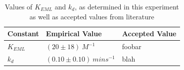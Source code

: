 \begin{table}[h]
    \begin{tabular}{| l | l | l |}
    \hline
    Constant & Empirical Value & Accepted Value \\ \hline
    $K_{EML}$ & $(20\pm{18}){\ }M^{-1}$ & foobar \\ \hline
    $k_{d}$ & $(0.10\pm{0.10}){\ }mins^{-1}$ & blah \\ 
    \hline
    \end{tabular}
    \caption[Table caption text]{Values of $K_{EML}$ and $k_d$, as determined in this experiment as well as accepted values from literature}
    \label{tbl:summary}
\end{table}